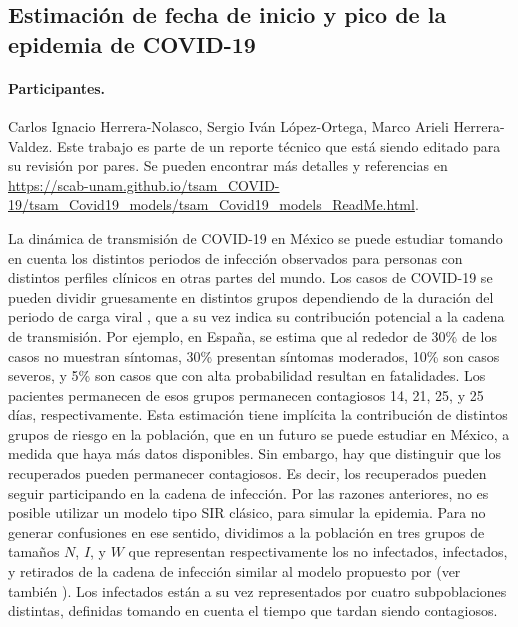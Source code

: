 
\subsection*{Estimación de fecha de inicio y pico de la epidemia de COVID-19}
\paragraph{Participantes.} Carlos Ignacio Herrera-Nolasco, Sergio Iván López-Ortega, Marco Arieli Herrera-Valdez. Este trabajo es parte de un reporte técnico que está siendo editado para su revisión por pares. Se pueden encontrar más detalles y referencias en \url{https://scab-unam.github.io/tsam_COVID-19/tsam_Covid19_models/tsam_Covid19_models_ReadMe.html}.

La dinámica de transmisión de COVID-19 en México se puede estudiar tomando en cuenta los distintos periodos de infección observados para personas con distintos perfiles clínicos en otras partes del mundo.
Los casos de COVID-19 se pueden dividir gruesamente en distintos grupos dependiendo de la duración del periodo de carga viral \citep{zhou2020clinical}, que a su vez indica su contribución potencial a la cadena de transmisión. Por ejemplo, en España, se estima que al rededor de 30\% de los casos no muestran síntomas, 30\% presentan síntomas moderados, 10\% son casos severos, y 5\% son casos que con alta probabilidad resultan en fatalidades.  Los pacientes permanecen de esos grupos permanecen contagiosos 14, 21, 25, y 25 días, respectivamente.
Esta estimación tiene implícita la contribución de distintos grupos de riesgo en la población, que en un futuro se puede estudiar en México, a medida que haya más datos disponibles.
Sin embargo, hay que distinguir que los recuperados pueden permanecer contagiosos. Es decir, los recuperados pueden seguir participando en la cadena de infección. Por las razones anteriores, no es posible utilizar un modelo tipo SIR clásico, para simular la epidemia. Para no generar confusiones en ese sentido, dividimos a la población en tres grupos de tamaños $N$, $I$, y $W$ que representan respectivamente los no infectados, infectados, y retirados de la cadena de infección similar al modelo propuesto por \cite{herrera2020tesis} (ver también \cite{herrera2020pNIW}). Los infectados están a su vez representados por cuatro subpoblaciones distintas, definidas tomando en cuenta el tiempo que tardan siendo contagiosos.


